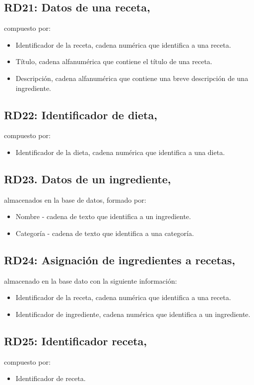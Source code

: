 \documentclass[12pt,letterpaper]{article}
\begin{document}
\subsection{RD21: Datos de una receta,} compuesto por:
\begin{itemize}
\item Identificador de la receta, cadena numérica que identifica a una receta.
\item Título, cadena alfanumérica que contiene el título de una receta.
\item Descripción, cadena alfanumérica que contiene una breve descripción de una ingrediente.

\end{itemize} 
\subsection{RD22: Identificador de dieta,} compuesto por:
\begin{itemize}
\item Identificador de la dieta, cadena numérica que identifica a una dieta.

\end{itemize} 
\subsection{RD23. Datos de un ingrediente,} almacenados en la base de datos, formado por:
\begin{itemize}
\item Nombre -  cadena de texto que identifica a un ingrediente.
\item Categoría - cadena de texto que identifica a una categoría.

\end{itemize}
 \subsection{RD24: Asignación de ingredientes a recetas,} almacenado en la base dato con la siguiente información:
\begin{itemize}
\item Identificador de la receta, cadena numérica que identifica a una receta.
\item Identificador de ingrediente, cadena numérica que identifica a un ingrediente.

\end{itemize} 
\subsection{RD25: Identificador receta,} compuesto por:
\begin{itemize}
\item Identificador de receta.

\end{itemize} 
\end{document}
